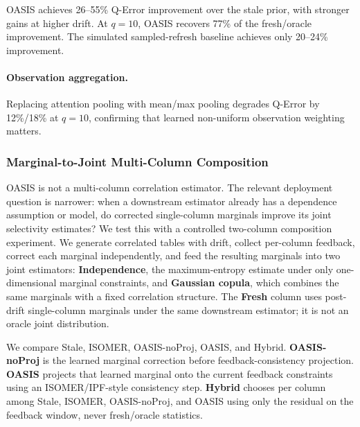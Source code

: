 \documentclass[runningheads]{llncs}
\begin{document}
OASIS achieves 26--55\% Q-Error improvement over the stale prior, with stronger gains at higher drift. At $q{=}10$, OASIS recovers 77\% of the fresh/oracle improvement. The simulated sampled-refresh baseline achieves only 20--24\% improvement.

\paragraph{Observation aggregation.}
Replacing attention pooling with mean/max pooling degrades Q-Error by 12\%/18\% at $q{=}10$, confirming that learned non-uniform observation weighting matters.

\subsubsection{Marginal-to-Joint Multi-Column Composition}
\label{sec:marginal_joint}

OASIS is not a multi-column correlation estimator. The relevant deployment question is narrower: when a downstream estimator already has a dependence assumption or model, do corrected single-column marginals improve its joint selectivity estimates? We test this with a controlled two-column composition experiment. We generate correlated tables with drift, collect per-column feedback, correct each marginal independently, and feed the resulting marginals into two joint estimators: \textbf{Independence}, the maximum-entropy estimate under only one-dimensional marginal constraints, and \textbf{Gaussian copula}, which combines the same marginals with a fixed correlation structure. The \textbf{Fresh} column uses post-drift single-column marginals under the same downstream estimator; it is not an oracle joint distribution.

We compare Stale, ISOMER, OASIS-noProj, OASIS, and Hybrid. \textbf{OASIS-noProj} is the learned marginal correction before feedback-consistency projection. \textbf{OASIS} projects that learned marginal onto the current feedback constraints using an ISOMER/IPF-style consistency step. \textbf{Hybrid} chooses per column among Stale, ISOMER, OASIS-noProj, and OASIS using only the residual on the feedback window, never fresh/oracle statistics.
\end{document}
